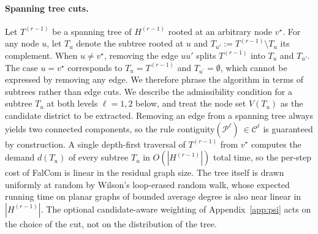 \documentclass[preprint,12pt,authoryear]{elsarticle}
\theoremstyle{definition}
\begin{document}
\paragraph{Spanning tree cuts.} Let $T^{(r-1)}$ be a spanning tree of $H^{(r-1)}$ rooted at an arbitrary node $v^\star$. For any node $u$, let $T_u$ denote the subtree rooted at $u$ and $T_{u'} := T^{(r-1)} \setminus T_u$ its complement. When $u \neq v^\star$, removing the edge $uu'$ splits $T^{(r-1)}$ into $T_u$ and $T_{u'}$. The case $u=v^\star$ corresponds to $T_u = T^{(r-1)}$ and $T_{u^\prime} = \emptyset$, which cannot be expressed by removing any edge. We therefore phrase the algorithm in terms of subtrees rather than edge cuts. We describe the admissibility condition for a subtree $T_u$ at both levels $\ell=1,2$ below, and treat the node set $V(T_u)$ as the candidate district to be extracted. Removing an edge from a spanning tree always yields two connected components, so the rule contiguity$(\mathcal{P}^{\ell}) \ \in \mathcal{C}^{\ell}$ is guaranteed by construction. A single depth-first traversal of $T^{(r-1)}$ from $v^\star$ computes the demand $d(T_u)$ of every subtree $T_u$ in $O(|H^{(r-1)}|)$ total time, so the per-step cost of FalCom is linear in the residual graph size. The tree itself is drawn uniformly at random by Wilson's loop-erased random walk, whose expected running time on planar graphs of bounded average degree is also near linear in $|H^{(r-1)}|$. The optional candidate-aware weighting of Appendix~\ref{app:psi} acts on the choice of the cut, not on the distribution of the tree.
\end{document}
